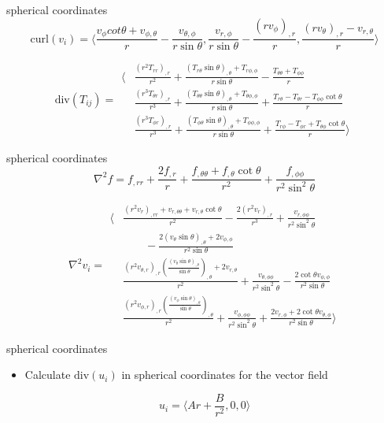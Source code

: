 \begin{frame}{spherical coordinates}
\protect\hypertarget{spherical-coordinates-2}{}
\[\text{curl} (v_i) = \langle \frac{v_\phi cot\theta+v_{\phi,\theta}}{r} - \frac{v_{\theta,\phi}}{r \sin \theta}, \frac{v_{r,\phi}}{r\sin\theta} - \frac{(rv_{\phi})_{,r}}{r}, \frac{(rv_\theta)_{,r}-v_{r,\theta}}{r} \rangle\]

\[\text{div}(T_{ij}) = \begin{aligned}\langle
    & \frac{(r^2T_{rr})_{,r}}{r^2} + \frac{(T_{r\theta}\sin\theta)_{,\theta}+T_{r\phi,\phi}}{r\sin\theta} - \frac{T_{\theta\theta} + T_{\phi\phi}}{r}\\
    & \frac{(r^3T_{\theta r})_{,r}}{r^3} + \frac{(T_{\theta\theta}\sin\theta)_{,\theta}+T_{\theta\phi,\phi}}{r\sin\theta} + \frac{T_{r\theta} - T_{\theta r}- T_{\phi\phi}\cot\theta}{r}\\
    & \frac{(r^3T_{\phi r})_{,r}}{r^3} + \frac{(T_{\phi\theta}\sin\theta)_{,\theta}+T_{\phi\phi,\phi}}{r\sin\theta} + \frac{T_{r\phi} - T_{\phi r}+ T_{\theta\phi}\cot\theta}{r}
\rangle\end{aligned}\]
\end{frame}

\begin{frame}{spherical coordinates}
\protect\hypertarget{spherical-coordinates-3}{}
\[\nabla^2 f = f_{,rr} + \frac{2 f_{,r}}{r} + \frac{f_{,\theta\theta}+ f_{,\theta}\cot \theta}{r^2} + \frac{f_{,\phi \phi}}{r^2\sin^2\theta}\]

\[\nabla^2 v_i = \begin{aligned}
    \langle & \frac{(r^2v_r)_{,rr}+v_{r,\theta\theta} + v_{r,\theta}\cot \theta}{r^2} - \frac{2(r^2v_r)_{,r}}{r^3} + \frac{v_{r,\phi \phi}}{r^2\sin^2\theta} \\
    &\qquad - \frac{2(v_\theta \sin \theta)_{,\theta} + 2v_{\phi,\phi}}{r^2 \sin \theta}\\
    &\frac{(r^2 v_{\theta,r})_{,r} \left(\frac{(v_{\theta}\sin\theta)_{,\theta}}{\sin \theta}\right)_{,\theta} + 2v_{r,\theta}}{r^2} + \frac{v_{\theta,\phi\phi}}{r^2\sin^2\theta} - \frac{2 \cot \theta v_{\phi,\phi}}{r^2 \sin\theta}\\
    &\frac{(r^2 v_{\phi,r})_{,r} \left(\frac{(v_{\phi}\sin\theta)_{,\theta}}{\sin \theta}\right)_{,\theta}}{r^2} + \frac{v_{\phi,\phi\phi}}{r^2\sin^2\theta} + \frac{2v_{r,\phi} + 2 \cot \theta v_{\theta,\phi}}{r^2 \sin\theta}
\rangle \end{aligned}\]
\end{frame}

\begin{frame}{spherical coordinates}
\protect\hypertarget{spherical-coordinates-4}{}
\begin{itemize}
\tightlist
\item
  Calculate \(\text{div}(u_i)\) in spherical coordinates for the vector
  field
\end{itemize}

\[u_i = \langle Ar + \frac{B}{r^2}, 0, 0 \rangle\]
\end{frame}


